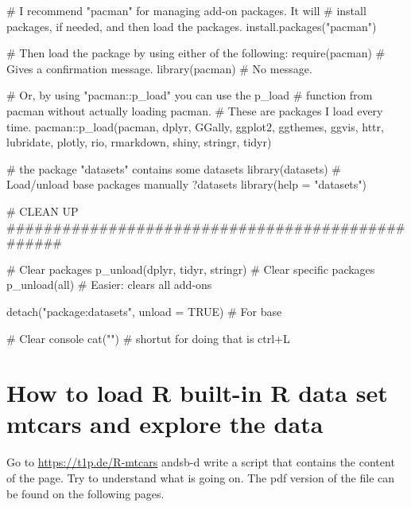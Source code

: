 \begin{rblock1}
	# I recommend "pacman" for managing add-on packages. It will
	# install packages, if needed, and then load the packages.
	install.packages("pacman")
	
	# Then load the package by using either of the following:
	require(pacman)  # Gives a confirmation message.
	library(pacman)  # No message.
	
	# Or, by using "pacman::p_load" you can use the p_load
	# function from pacman without actually loading pacman.
	# These are packages I load every time.
	pacman::p_load(pacman, dplyr, GGally, ggplot2, ggthemes, 
	ggvis, httr, lubridate, plotly, rio, rmarkdown, shiny, 
	stringr, tidyr) 
	
	
	# the package "datasets" contains some datasets 
	library(datasets)  # Load/unload base packages manually
	?datasets
	library(help = "datasets")
	
	# CLEAN UP #################################################
	
	# Clear packages
	p_unload(dplyr, tidyr, stringr) # Clear specific packages
	p_unload(all)  # Easier: clears all add-ons
	
	detach("package:datasets", unload = TRUE)  # For base
	
	# Clear console
	cat("")  # shortut for doing that is ctrl+L
\end{rblock1}

\section{How to load R built-in R data set mtcars and explore the data}\label{exe:mtcars}

Go to \url{https://t1p.de/R-mtcars} andsb-d write a script that contains the content of the page. Try to understand what is going on.
The pdf version of the file can be found on the following pages. 

